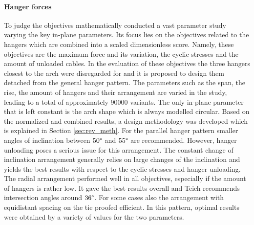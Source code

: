 \paragraph*{Hanger forces}
To judge the objectives mathematically \citep{Teich} conducted a vast parameter study varying the key in-plane parameters. Its focus lies on the objectives related to the hangers which are combined into a scaled dimensionless score. Namely, these objectives are the maximum force and its variation, the cyclic stresses and the amount of unloaded cables. In the evaluation of these objectives the three hangers closest to the arch were disregarded for and it is proposed to design them detached from the general hanger pattern. The parameters such as the span, the rise, the amount of hangers and their arrangement are varied in the study, leading to a total of approximately 90000 variants. The only in-plane parameter that is left constant is the arch shape which is always modelled circular. Based on the normalized and combined results, a design methodology was developed which is explained in Section \ref{sec:rev_meth}. For the parallel hanger pattern smaller angles of inclination between $50\degree$ and $55\degree$ are recommended. However, hanger unloading poses a serious issue for this arrangement. The constant change of inclination arrangement generally relies on large changes of the inclination and yields the best results with respect to the cyclic stresses and hanger unloading. The radial arrangement performed well in all objectives, especially if the amount of hangers is rather low. It gave the best results overall and Teich recommends intersection angles around $36\degree$. For some cases also the arrangement with equidistant spacing on the tie proofed efficient. In this pattern, optimal results were obtained by a variety of values for the two parameters.
